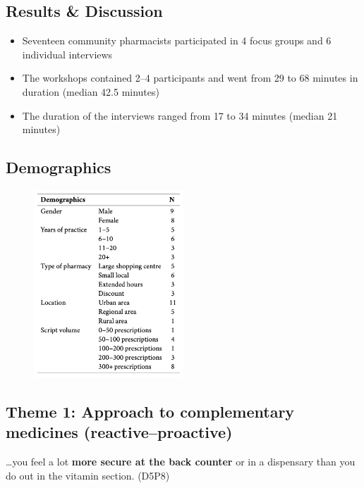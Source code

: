 \documentclass[]{article}
\begin{document}
\subsection{Results \& Discussion}\label{results-discussion}

\begin{itemize}
\item
  Seventeen community pharmacists participated in 4 focus groups and 6
  individual interviews
\item
  The workshops contained 2--4 participants and went from 29 to 68
  minutes in duration (median 42.5 minutes)
\item
  The duration of the interviews ranged from 17 to 34 minutes (median 21
  minutes)
\end{itemize}

\subsection{Demographics}\label{demographics}

\begin{figure}
\centering
\includegraphics[width=0.50000\textwidth]{files/demo.png}
\caption{}
\end{figure}

\subsection{Theme 1: Approach to complementary medicines
(reactive--proactive)}\label{theme-1-approach-to-complementary-medicines-reactiveproactive}

\ldots{}you feel a lot \textbf{more secure at the back counter} or in a
dispensary than you do out in the vitamin section. (D5P8)
\end{document}
